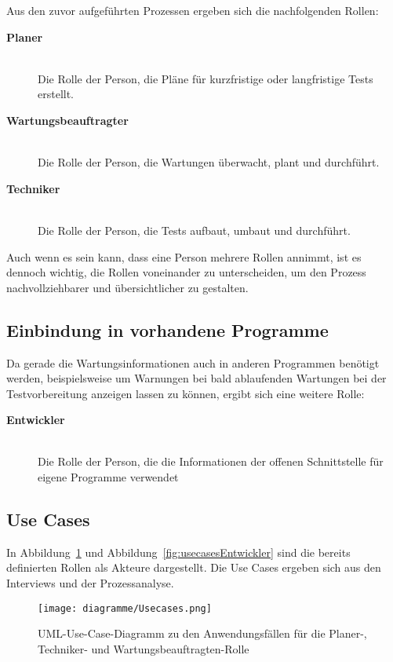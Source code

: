 \newpage

Aus den zuvor aufgeführten Prozessen ergeben sich die nachfolgenden Rollen:

\begin{description}
    \item[\textbf{Planer}]\hfill \\
    Die Rolle der Person, die Pläne für kurzfristige oder langfristige Tests erstellt.

    \item[\textbf{Wartungsbeauftragter}]\hfill \\
    Die Rolle der Person, die Wartungen überwacht, plant und durchführt. 

    \item[\textbf{Techniker}]\hfill \\
    Die Rolle der Person, die Tests aufbaut, umbaut und durchführt.
\end{description}

Auch wenn es sein kann, dass eine Person mehrere Rollen annimmt, ist es dennoch 
wichtig, die Rollen voneinander zu unterscheiden, um den Prozess nachvollziehbarer
und übersichtlicher zu gestalten.

\subsection{Einbindung in vorhandene Programme}
Da gerade die Wartungsinformationen auch in anderen Programmen benötigt werden, 
beispielsweise um Warnungen bei bald ablaufenden Wartungen bei der Testvorbereitung
anzeigen lassen zu können, ergibt sich eine weitere Rolle:

\begin{description}
    \item[\textbf{Entwickler}]\hfill \\
    Die Rolle der Person, die die Informationen der offenen Schnittstelle für eigene Programme verwendet
\end{description}

\subsection{Use Cases}\label{sec:usecases}
In Abbildung~\ref{fig:usecases} und Abbildung~\ref{fig:usecasesEntwickler} sind 
die bereits definierten Rollen als Akteure dargestellt.
Die Use Cases ergeben sich aus den Interviews und der Prozessanalyse.

\begin{figure}[H]
    \texttt{[image: diagramme/Usecases.png]}
    \caption{UML-Use-Case-Diagramm zu den Anwendungsfällen für die Planer-, Techniker- und Wartungsbeauftragten-Rolle}\label{fig:usecases}
\end{figure}

